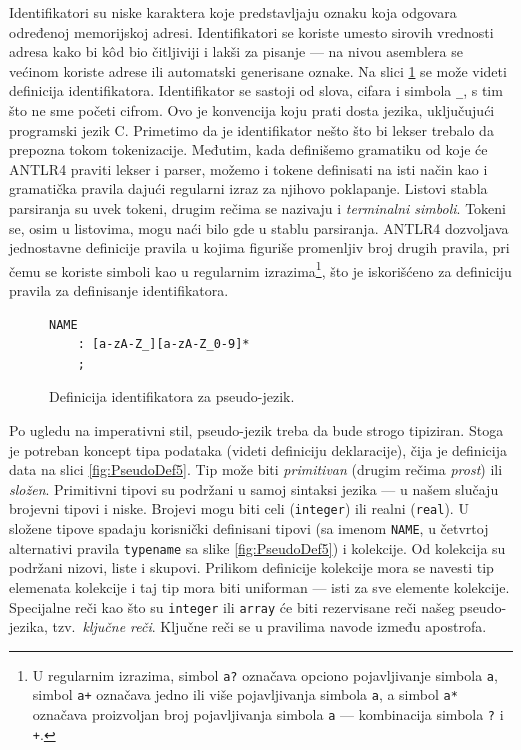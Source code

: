 Identifikatori su niske karaktera koje predstavljaju oznaku koja odgovara određenoj memorijskoj adresi. Identifikatori se koriste umesto sirovih vrednosti adresa kako bi k\^od bio čitljiviji i lakši za pisanje --- na nivou asemblera se većinom koriste adrese ili automatski generisane oznake. Na slici \ref{fig:PseudoDef4} se može videti definicija identifikatora. Identifikator se sastoji od slova, cifara i simbola \texttt{\_}, s tim što ne sme početi cifrom. Ovo je konvencija koju prati dosta jezika, uključujući programski jezik C. Primetimo da je identifikator nešto što bi lekser trebalo da prepozna tokom tokenizacije. Međutim, kada definišemo gramatiku od koje će ANTLR4 praviti lekser i parser, možemo i tokene definisati na isti način kao i gramatička pravila dajući regularni izraz za njihovo poklapanje. Listovi stabla parsiranja su uvek tokeni, drugim rečima se nazivaju i \emph{terminalni simboli}. Tokeni se, osim u listovima, mogu naći bilo gde u stablu parsiranja. ANTLR4 dozvoljava jednostavne definicije pravila u kojima figuriše promenljiv broj drugih pravila, pri čemu se koriste simboli kao u regularnim izrazima\footnote{U regularnim izrazima, simbol \texttt{a?} označava opciono pojavljivanje simbola \texttt{a}, simbol \texttt{a+} označava jedno ili više pojavljivanja simbola \texttt{a}, a simbol \texttt{a*} označava proizvoljan broj pojavljivanja simbola \texttt{a} --- kombinacija simbola \texttt{?} i \texttt{+}.}, što je iskorišćeno za definiciju pravila za definisanje identifikatora.

\begin{figure}[h!]
\begin{lstlisting}[language={}]
NAME
    : [a-zA-Z_][a-zA-Z_0-9]*
    ;
\end{lstlisting}
\caption{Definicija identifikatora za pseudo-jezik.}
\label{fig:PseudoDef4}
\end{figure}

Po ugledu na imperativni stil, pseudo-jezik treba da bude strogo tipiziran. Stoga je potreban  koncept tipa podataka (videti definiciju deklaracije), čija je definicija data na slici \ref{fig:PseudoDef5}. Tip može biti \emph{primitivan} (drugim rečima \emph{prost}) ili \emph{složen}. Primitivni tipovi su podržani u samoj sintaksi jezika --- u našem slučaju brojevni tipovi i niske. Brojevi mogu biti celi (\texttt{integer}) ili realni (\texttt{real}). U složene tipove spadaju korisnički definisani tipovi (sa imenom \texttt{NAME}, u četvrtoj alternativi pravila \texttt{typename} sa slike \ref{fig:PseudoDef5}) i kolekcije. Od kolekcija su podržani nizovi, liste i skupovi. Prilikom definicije kolekcije mora se navesti tip elemenata kolekcije i taj tip mora biti uniforman --- isti za sve elemente kolekcije. Specijalne reči kao što su \texttt{integer} ili \texttt{array} će biti rezervisane reči našeg pseudo-jezika, tzv.~\emph{ključne reči}. Ključne reči se u pravilima navode između apostrofa.

